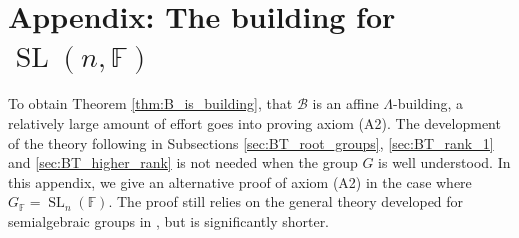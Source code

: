 \documentclass[12pt]{amsart}
\newcommand{\F}{\mathbb{F} }
\newcommand{\B}{\mathcal{B}}
\numberwithin{equation}{section}
\theoremstyle{remark} %
\begin{document}
\section{Appendix: The building for \texorpdfstring{$\operatorname{SL}(n,\F)$}{SL(n,F)}}\label{sec:appendixSLn}

To obtain Theorem \ref{thm:B_is_building}, that $\B$ is an affine $\Lambda$-building, a relatively large amount of effort goes into proving axiom (A2). The development of the theory following \cite{BrTi} in Subsections \ref{sec:BT_root_groups}, \ref{sec:BT_rank_1} and \ref{sec:BT_higher_rank} is not needed when the group $G$ is well understood. In this appendix, we give an alternative proof of axiom (A2) in the case where $G_\F = \operatorname{SL}_n(\F)$. The proof still relies on the general theory developed for semialgebraic groups in \cite[Sections \ref{I-sec:split_tori} and \ref{I-sec:decompositions}]{AppAGRCF}, but is significantly shorter.
\end{document}
